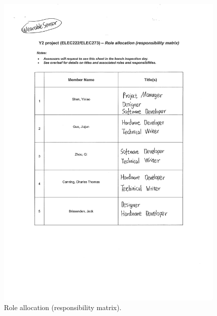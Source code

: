 \documentclass[12pt, a4paper]{report}
\begin{document}
\begin{figure}[htbp]
	\centering
	\includegraphics[width=\textwidth]{
		appendix/role-allocation}
	\caption{Role allocation (responsibility matrix).}
	\label{fig:role-allocation}
\end{figure}
\end{document}
